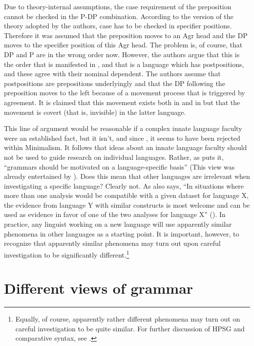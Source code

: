 \documentclass[output=paper
 	        ,biblatex
                ,babelshorthands
                ,newtxmath
                ,draftmode
                ,colorlinks, citecolor=brown
]{langscibook}
\begin{document}
Due to theory-internal assumptions, the case requirement of the preposition cannot be checked in the
P-DP combination. According to the version of the theory adopted by the authors, case has to be
checked in specifier positions. Therefore it was assumed that the preposition moves to an Agr head
and the DP moves to the specifier position of this Agr head. The problem is, of course, that DP and P
are in the wrong order now. However, the authors argue that this is the order that is manifested in
, and that  is a language which has postpositions, and these agree with
their nominal dependent. The authors assume that  postpositions are prepositions
underlyingly and that the DP following the preposition moves to the left because of a movement
process that is triggered by agreement. It is claimed that this movement exists both in  and in  but
that the movement is covert (that is, invisible) in the latter language.

This line of argument would be reasonable if a complex innate language
faculty were an established fact, but it isn't, and since \citet*{HCF2002a}, it seems to have been
rejected within Minimalism. It follows that ideas about an innate language faculty should not be
used to guide research on individual languages. Rather, as \citet[25]{MuellerCoreGram} puts it,
``grammars should be motivated on a language-specific basis'' (This view was already entertained by
\citet[, 43]{Boas1911a-u}). Does this mean that other languages are
irrelevant when investigating a specific language? Clearly not. As 
also says, ``In situations where more than one analysis would be compatible with a given dataset
for language X, the evidence from language Y with similar constructs is most welcome and can be used
as evidence in favor of one of the two analyses for language X'' (\citeyear[43]{MuellerCoreGram}). In
practice, any linguist working on a new language will use apparently similar phenomena in other
languages as a starting point. It is important, however, to recognize that apparently similar
phenomena may turn out upon careful investigation to be significantly different.\footnote{%
  Equally, of course, apparently rather different phenomena may turn out on careful investigation to
  be quite similar. For further discussion of HPSG and comparative syntax, see .%
} 

\section{Different views of grammar}
\label{sec:min-views-grammar}
\end{document}
